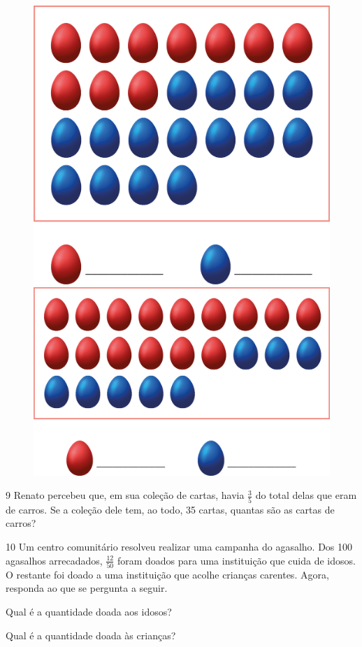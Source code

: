 \begin{figure}[htpb!]
\centering
\includegraphics[width=.4\textwidth]{media/image64.png}
\includegraphics[width=.4\textwidth]{media/image65.png}
\end{figure}


\num{9} Renato percebeu que, em sua coleção de cartas, havia $\frac{3}{5}$ do total delas
que eram de carros. Se a coleção dele tem, ao todo, 35 cartas, quantas são
as cartas de carros?

\begin{mdframed}[linewidth=2pt,linecolor=salmao,roundcorner=2pt]
\vspace{2cm}
\end{mdframed}

\num{10} Um centro comunitário resolveu realizar uma campanha do agasalho. Dos
100 agasalhos arrecadados, $\frac{12}{50}$ foram doados para uma instituição que
cuida de idosos. O restante foi doado a uma instituição que acolhe
crianças carentes. Agora, responda ao que se pergunta a seguir.

\begin{escolha}
\item
  Qual é a quantidade doada aos idosos?
\item{}

\item
  Qual é a quantidade doada às crianças?
\item{}
\end{escolha}


